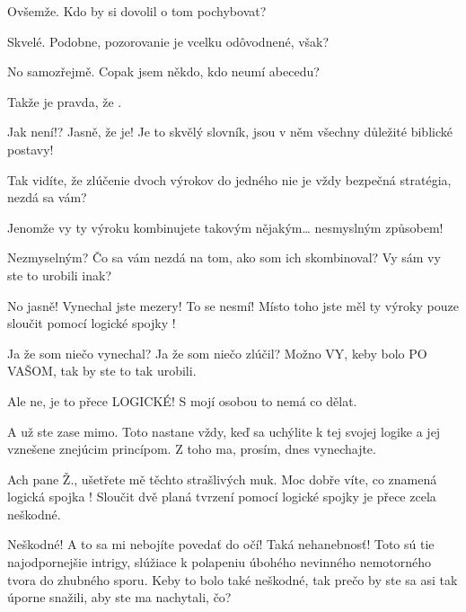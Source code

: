 \documentclass[12pt]{article}
\begin{document}
\begin{description}[itemsep=0pt]
\item[A:] Ovšemže. Kdo by si dovolil o tom pochybovat?

\item[Ž:] Skvelé. Podobne, pozorovanie  
    je vcelku odôvodnené, však?

\item[A:] No samozřejmě. Copak jsem někdo, kdo neumí abecedu?

\item[Ž:] Takže je pravda, že .

\item[A:] Jak není!? Jasně, že je! Je to skvělý slovník, jsou v něm všechny
    důležité biblické postavy!

\item[Ž:] Tak vidíte, že zlúčenie dvoch výrokov do jedného nie je vždy bezpečná 
    stratégia, nezdá sa vám?

\item[A:] Jenomže vy ty výroku kombinujete takovým nějakým… nesmyslným způsobem!

\item[Ž:] Nezmyselným? Čo sa vám nezdá na tom, ako som ich skombinoval? Vy sám 
    vy ste to urobili inak?

\item[A:] No jasně! Vynechal jste mezery! To se nesmí! Místo toho jste měl ty
    výroky pouze sloučit pomocí logické spojky !

\item[Ž:] Ja že som niečo vynechal? Ja že som niečo zlúčil? Možno VY, keby bolo 
    PO VAŠOM, tak by ste to tak urobili.

\item[A:] Ale ne, je to přece LOGICKÉ! S mojí osobou to nemá co dělat.

\item[Ž:] A už ste zase mimo. Toto nastane vždy, keď sa uchýlite k tej svojej 
    logike a jej vznešene znejúcim princípom. Z toho ma, prosím, dnes vynechajte.

\item[A:] Ach pane Ž., ušetřete mě těchto strašlivých muk. Moc dobře víte, co
    znamená logická spojka ! Sloučit dvě planá tvrzení pomocí logické spojky
     je přece zcela neškodné.

\item[Ž:] Neškodné! A to sa mi nebojíte povedať do očí! Taká nehanebnosť! Toto sú 
    tie najodpornejšie intrigy, slúžiace k polapeniu úbohého nevinného nemotorného 
    tvora do zhubného sporu. Keby to bolo také neškodné, tak prečo by ste sa 
    asi tak úporne snažili, aby ste ma nachytali, čo?


\end{description}
\end{document}
